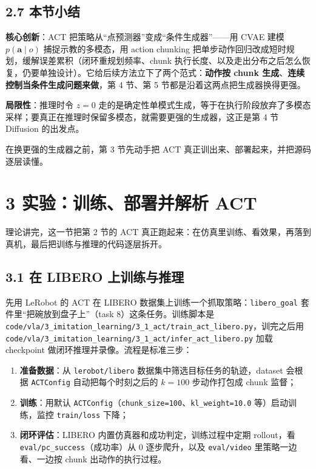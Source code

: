 \documentclass[
  chinese,
]{ctexart}
\providecommand{\tightlist}{%
  \setlength{\itemsep}{0pt}\setlength{\parskip}{0pt}}
\begin{document}
\subsection{2.7 本节小结}\label{ux672cux8282ux5c0fux7ed3}

\textbf{核心创新}：ACT 把策略从``点预测器''变成``条件生成器''------用
CVAE 建模 \(p(\mathbf{a} \mid o)\) 捕捉示教的多模态，用 action chunking
把单步动作回归改成短时规划，缓解误差累积（闭环重规划频率、chunk
执行长度、以及走出分布之后怎么恢复，仍要单独设计）。它给后续方法立下了两个范式：\textbf{动作按
chunk 生成}、\textbf{连续控制当条件生成问题来做}，第 4 节、第 5
节都是沿着这两点把生成器换得更强。

\textbf{局限性}：推理时令 \(z = 0\)
走的是确定性单模式生成，等于在执行阶段放弃了多模态采样；要真正在推理时保留多模态，就需要更强的生成器，这正是第
4 节 Diffusion 的出发点。

在换更强的生成器之前，第 3 节先动手把 ACT
真正训出来、部署起来，并把源码逐层读懂。

\section{3 实验：训练、部署并解析
ACT}\label{ux5b9eux9a8cux8badux7ec3ux90e8ux7f72ux5e76ux89e3ux6790-act}

理论讲完，这一节把第 2 节的 ACT
真正跑起来：在仿真里训练、看效果，再落到真机，最后把训练与推理的代码逐层拆开。

\subsection{3.1 在 LIBERO
上训练与推理}\label{ux5728-libero-ux4e0aux8badux7ec3ux4e0eux63a8ux7406}

先用 LeRobot 的 ACT 在 LIBERO
数据集上训练一个抓取策略：\texttt{libero\_goal}
套件里``把碗放到盘子上''（task 8）这条任务。训练脚本是
\texttt{code/vla/3\_imitation\_learning/3\_1\_act/train\_act\_libero.py}，训完之后用
\texttt{code/vla/3\_imitation\_learning/3\_1\_act/infer\_act\_libero.py}
加载 checkpoint 做闭环推理并录像。流程是标准三步：

\begin{enumerate}
\def\labelenumi{\arabic{enumi}.}
\tightlist
\item
  \textbf{准备数据}：从 \texttt{lerobot/libero}
  数据集中筛选目标任务的轨迹，dataset 会根据 \texttt{ACTConfig}
  自动把每个时刻之后的 \(k=100\) 步动作打包成 chunk 监督；
\item
  \textbf{训练}：用默认
  \texttt{ACTConfig}（\texttt{chunk\_size=100}、\texttt{kl\_weight=10.0}
  等）启动训练，监控 \texttt{train/loss} 下降；
\item
  \textbf{闭环评估}：LIBERO 内置仿真器和成功判定，训练过程中定期
  rollout，看 \texttt{eval/pc\_success}（成功率）从 0 逐步爬升，以及
  \texttt{eval/video} 里策略一边看、一边按 chunk 出动作的执行过程。
\end{enumerate}
\end{document}
